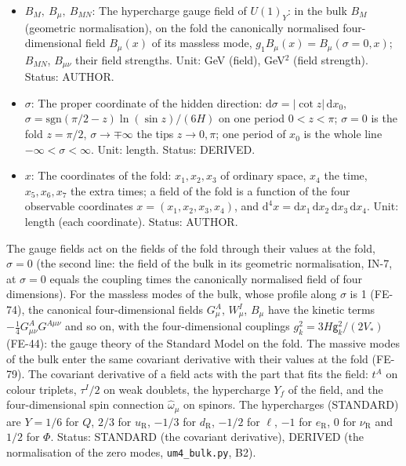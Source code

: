 \documentclass[
  10pt,
]{article}
\begin{document}
\begin{itemize}
  Status: STANDARD.
\item
  \(B_M,\ B_\mu,\ B_{MN}\): The hypercharge gauge field of \(U(1)_Y\):
  in the bulk \(B_M\) (geometric normalisation), on the fold the
  canonically normalised four-dimensional field \(B_\mu(x)\) of its
  massless mode, \(g_1B_\mu(x) = B_\mu(\sigma = 0, x)\); \(B_{MN}\),
  \(B_{\mu\nu}\) their field strengths. Unit: GeV (field), GeV\(^2\)
  (field strength). Status: AUTHOR.
\item
  \(\sigma\): The proper coordinate of the hidden direction:
  \(\mathrm{d}\sigma = \lvert\cot z\rvert\,\mathrm{d}x_0\),
  \(\sigma = \mathrm{sgn}(\pi/2 - z)\ln(\sin z)/(6H)\) on one period
  \(0 < z < \pi\); \(\sigma = 0\) is the fold \(z = \pi/2\),
  \(\sigma \to \mp\infty\) the tips \(z \to 0, \pi\); one period of
  \(x_0\) is the whole line \(-\infty < \sigma < \infty\). Unit: length.
  Status: DERIVED.
\item
  \(x\): The coordinates of the fold: \(x_1, x_2, x_3\) of ordinary
  space, \(x_4\) the time, \(x_5, x_6, x_7\) the extra times; a field of
  the fold is a function of the four observable coordinates
  \(x = (x_1, x_2, x_3, x_4)\), and
  \(\mathrm{d}^4x = \mathrm{d}x_1\,\mathrm{d}x_2\,\mathrm{d}x_3\,\mathrm{d}x_4\).
  Unit: length (each coordinate). Status: AUTHOR.
\end{itemize}

The gauge fields act on the fields of the fold through their values at
the fold, \(\sigma = 0\) (the second line: the field of the bulk in its
geometric normalisation, IN-7, at \(\sigma = 0\) equals the coupling
times the canonically normalised field of four dimensions). For the
massless modes of the bulk, whose profile along \(\sigma\) is 1 (FE-74),
the canonical four-dimensional fields \(G^A_\mu\), \(W^I_\mu\),
\(B_\mu\) have the kinetic terms \(-\frac14 G^A_{\mu\nu}G^{A\mu\nu}\)
and so on, with the four-dimensional couplings
\(g_k^2 = 3H\mathsf{g}_k^2/(2V_*)\) (FE-44): the gauge theory of the
Standard Model on the fold. The massive modes of the bulk enter the same
covariant derivative with their values at the fold (FE-79). The
covariant derivative of a field acts with the part that fits the field:
\(t^A\) on colour triplets, \(\tau^I/2\) on weak doublets, the
hypercharge \(Y_f\) of the field, and the four-dimensional spin
connection \(\hat\omega_\mu\) on spinors. The hypercharges (STANDARD)
are \(Y = 1/6\) for \(Q\), \(2/3\) for \(u_{\mathrm{R}}\), \(-1/3\) for
\(d_{\mathrm{R}}\), \(-1/2\) for \(\ell\), \(-1\) for
\(e_{\mathrm{R}}\), \(0\) for \(\nu_{\mathrm{R}}\) and \(1/2\) for
\(\Phi\). Status: STANDARD (the covariant derivative), DERIVED (the
normalisation of the zero modes, \texttt{um4\_bulk.py}, B2).
\end{document}
